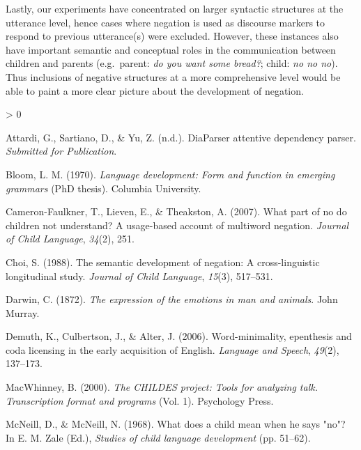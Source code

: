 \documentclass[
  english,
  man,floatsintext]{apa6}
\newlength{\cslhangindent}
\newenvironment{CSLReferences}[2] %
 {%
  \setlength{\parindent}{0pt}
  \ifodd #1 \everypar{\setlength{\hangindent}{\cslhangindent}}\ignorespaces\fi
  \ifnum #2 > 0
  \setlength{\parskip}{#2\baselineskip}
  \fi
 }%
 {}
\begin{document}
Lastly, our experiments have concentrated on larger syntactic structures at the utterance level, hence cases where negation is used as discourse markers to respond to previous utterance(s) were excluded. However, these instances also have important semantic and conceptual roles in the communication between children and parents (e.g.~parent: \emph{do you want some bread?}; child: \emph{no no no}). Thus inclusions of negative structures at a more comprehensive level would be able to paint a more clear picture about the development of negation.

\begingroup
\setlength{\parindent}{-0.5in}
\setlength{\leftskip}{0.5in}

\endgroup

\hypertarget{refs}{}
\begin{CSLReferences}{1}{0}
\leavevmode\hypertarget{ref-diaparser}{}%
Attardi, G., Sartiano, D., \& Yu, Z. (n.d.). DiaParser attentive dependency parser. \emph{Submitted for Publication}.

\leavevmode\hypertarget{ref-bloom1970language}{}%
Bloom, L. M. (1970). \emph{Language development: Form and function in emerging grammars} (PhD thesis). Columbia University.

\leavevmode\hypertarget{ref-cameron2007part}{}%
Cameron-Faulkner, T., Lieven, E., \& Theakston, A. (2007). What part of no do children not understand? A usage-based account of multiword negation. \emph{Journal of Child Language}, \emph{34}(2), 251.

\leavevmode\hypertarget{ref-choi1988semantic}{}%
Choi, S. (1988). The semantic development of negation: A cross-linguistic longitudinal study. \emph{Journal of Child Language}, \emph{15}(3), 517--531.

\leavevmode\hypertarget{ref-darwin1872expression}{}%
Darwin, C. (1872). \emph{The expression of the emotions in man and animals}. John Murray.

\leavevmode\hypertarget{ref-demuth2006word}{}%
Demuth, K., Culbertson, J., \& Alter, J. (2006). Word-minimality, epenthesis and coda licensing in the early acquisition of {E}nglish. \emph{Language and Speech}, \emph{49}(2), 137--173.

\leavevmode\hypertarget{ref-macwhinney2000childes}{}%
MacWhinney, B. (2000). \emph{The CHILDES project: Tools for analyzing talk. Transcription format and programs} (Vol. 1). Psychology Press.

\leavevmode\hypertarget{ref-mcneill1968}{}%
McNeill, D., \& McNeill, N. (1968). What does a child mean when he says "no"? In E. M. Zale (Ed.), \emph{Studies of child language development} (pp. 51--62).


\end{CSLReferences}
\end{document}
